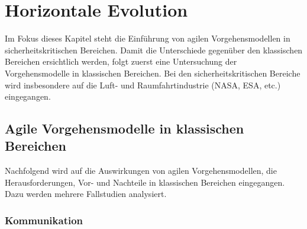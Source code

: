 \chapter{Horizontale Evolution} %

Im Fokus dieses Kapitel steht die Einführung von agilen Vorgehensmodellen in sicherheitskritischen Bereichen.
Damit die Unterschiede gegenüber den klassischen Bereichen ersichtlich werden, folgt zuerst eine Untersuchung der Vorgehensmodelle in klassischen Bereichen.
Bei den sicherheitskritischen Bereiche wird insbesondere auf die Luft- und Raumfahrtindustrie (NASA, ESA, etc.) eingegangen.

\section{Agile Vorgehensmodelle in klassischen Bereichen} %

Nachfolgend wird auf die Auswirkungen von agilen Vorgehensmodellen, die Herausforderungen, Vor- und Nachteile in klassischen Bereichen eingegangen.
Dazu werden mehrere Fallstudien analysiert.

\subsection{Kommunikation} %

